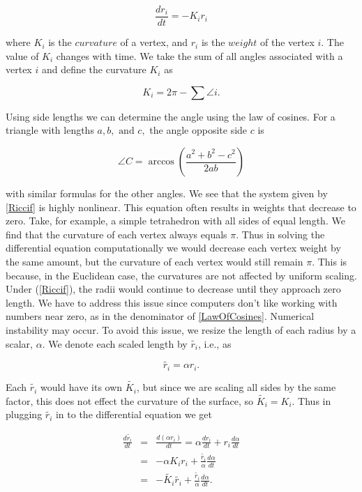 \documentclass[12pt]{article}
\begin{document}
  \begin{equation}
  \label{Riccif}
  \frac{dr_i}{{dt}} = -K_ir_i
  \end{equation}
  
 where $K_i$ is the $curvature$ of a vertex, and $r_i$ is the $weight$ of the vertex $i$. The value of $K_i$ changes with time. We take the sum of all angles associated with a vertex $i$ and define the curvature $K_i$ as

\begin{equation}
K_i = 2\pi - \sum{\angle i}.
\end{equation}

Using side lengths we can determine the angle using the law of cosines. For a triangle with lengths $a, b,\mbox{ and }c,$ the angle opposite side $c$ is
  
  \begin{equation}
  \label{LawOfCosines}
  \angle C = \arccos(\frac{a^2 + b^2 - c^2}{2ab})
  \end{equation}
  
 with similar formulas for the other angles. We see that the system given by \ref{Riccif} is highly nonlinear. This equation often results in weights that decrease to zero. Take, for example, a simple tetrahedron with all sides of equal length. We find that the curvature of each vertex always equals $\pi$. Thus in solving the differential equation computationally we would decrease each vertex weight by the same amount, but the curvature of each vertex would still remain $\pi.$ This is because, in the Euclidean case, the curvatures are not affected by uniform scaling. Under (\ref{Riccif}), the radii would continue to decrease until they approach zero length. We have to address this issue since computers don't like working with numbers near zero, as in the denominator of \ref{LawOfCosines}. Numerical instability may occur. To avoid this issue, we resize the length of each radius by a scalar, $\alpha$. We denote each scaled length by $\tilde{r_i}$, i.e., as
 
$$ \tilde{r_i} = \alpha r_i. $$ 
 
 Each $\tilde{r_i}$ would have its own $\tilde{K_i}$, but since we are scaling all sides by the same factor, this does not effect the curvature of the surface, so $\tilde{K_i} = K_i$. Thus in plugging $\tilde{r_i}$ in to the differential equation we get
 
 \begin{eqnarray}
 \label{ref1}
 \frac{d\tilde{r_i}}{dt} &=& \frac{d(\alpha r_i)}{dt} = \alpha \frac{dr_i}{dt} + r_i\frac{d\alpha}{dt}\nonumber\\
 &=& -\alpha K_ir_i + \frac{\tilde{r_i}}{\alpha}\frac{d\alpha}{dt} \nonumber \\
 &=& -\tilde{K_i}\tilde{r_i} + \frac{\tilde{r_i}}{\alpha}\frac{d\alpha}{dt}.
 \end{eqnarray}
 
\end{document}
